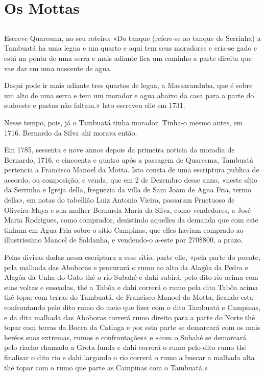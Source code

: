\chapter{Os Mottas}
\section*{}
Escreve Quaresma, no seu roteiro: «Do tanque (refere-se ao tanque de Serrinha) a Tambuatá ha uma legua e um quarto e aqui tem seus moradores e cria-se gado e está na ponta de uma serra e mais adiante fica um caminho a parte direita que vae dar em uma nascente de agua.

Daqui pode ir mais adiante tres quartos de legua, a Massaranduba, que é sobre um alto de uma serra e tem um morador e agua abaixo da casa para a parte do sudoeste e pastos não faltam.» Isto escreveu elle em 1731.

Nesse tempo, pois, já o Tambuatá tinha morador. Tinha-o mesmo antes, em 1716. Bernardo da Silva ahi morava então.

Em 1785, sessenta e nove annos depois da primeira noticia da moradia de Bernardo, 1716, e cincoenta e quatro após a passagem de Quaresma, Tambuatá pertencia a Francisco Manoel da Motta. Isto consta de uma escriptura publica de accordo, ou composição, e venda, que em 2 de Dezembro desse anno, «neste sítio da Serrinha e Igreja della, freguezia da villa de Sam Joam de Agua Fria, termo della», em notas do tabellião Luiz Antonio Vieira, passaram Fructuoso de Oliveira Maya e sua mulher Bernarda Maria da Silva, como vendedores, a José Maria Rodrigues, como comprador, desistindo aquelles da demanda que com este tinham em Agua Fria sobre o sítio Campinas, que elles haviam comprado ao illustrissimo Manoel de Saldanha, e vendendo-o a-este por 270\$800, a prazo.

Pelas divisas dadas nessa escriptura a esse sitio, parte elle, «pela parte do poente, pela malhada das Aboboras e procurará o rumo ao alto da Alagôa da Pedra e Alagôa da \label{lenha}Unha do Gato thé o rio Subahé e dahi subirá, pelo dito rio acima com suas voltas e enseadas, thé a Tabôa e dahi correrá o rumo pela dita Tabôa acima thé topa: com terras do Tambuatá, de Francisco Manoel da Motta, ficando esta confrontando pelo dito rumo do meio que fizer com o dito Tambuatá e Campinas, e da dita malhada das Aboboras correrá rumo direito para a parte do Norte thé topar com terras da Bocca da Catinga e por esta parte se demarcará com os mais heréos suas extremas, rumos e confrontações» e «com o Subahé se demarcará pelo riacho chamado a Grota funda e dahi correrá o rumo pelo dito rumo thé finalisar o dito rio e dahi largando o rio correrá o rumo a buscar a malhada alta thé topar com o rumo que parte as Campinas com o Tambuatá.»

